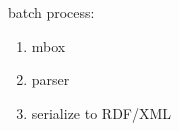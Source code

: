 \documentclass[spanish,notes=hide,16pt]{beamer}
\begin{document}
{\begin{columns}
\begin{column}{0.5\textwidth}
\begin{center}
	\end{center}
   \end{column}
   \begin{column}{0.5\textwidth}
	\begin{Large}batch process:\end{Large}
	\begin{enumerate}
	 \item<2-> mbox
	 \item<3-> parser
	 \item<4-> serialize to RDF/XML 
	\end{enumerate}
   \end{column}
  \end{columns}
}
\end{document}
